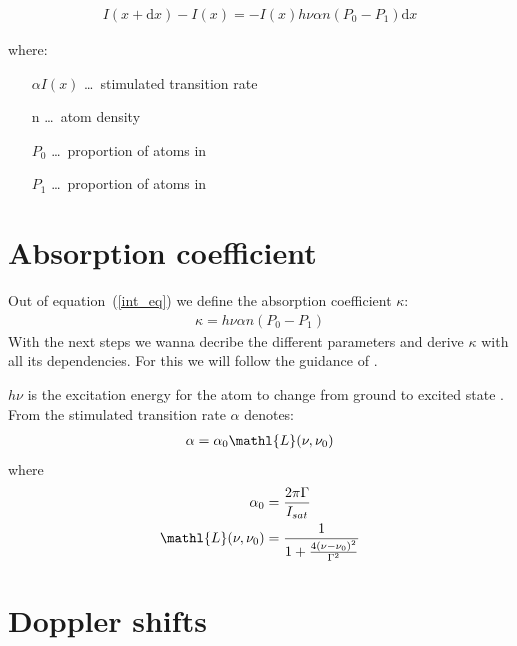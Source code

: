\begin{align}
    I(x+\mathrm{d}x)-I(x) = - I(x) h\nu \alpha n  (P_0-P_1) \mathrm{d}x \label{int_eq}
\end{align}

where:
\begin{itemize}
    \setlength{\itemsep}{0ex}
    \item[\(\alpha I(x)\)]\ldots~stimulated transition rate
    \item[n]\ldots~atom density
    \item[\(P_0\)]\ldots~proportion of atoms in 
    \item[\(P_1\)]\ldots~proportion of atoms in 
\end{itemize}
\pagebreak
\section{Absorption coefficient}  %
Out of equation~(\ref{int_eq}) we define the absorption coefficient \(\kappa \):
\begin{align}
    \kappa = h\nu \alpha n  (P_0-P_1) \label{kappa}
\end{align}
With the next steps we wanna decribe the different parameters and derive \(\kappa \) with all
its dependencies. For this we will follow the guidance of \citep{SAS}.
\bigskip

\(h\nu \) is the excitation energy for the atom to change from ground  to excited state . \\
From the stimulated transition rate \(\alpha \) denotes:
\begin{align}
    \alpha = \alpha_0 \mathl{L}(\nu,\nu_0)
\end{align}
where
\begin{align}
    \alpha_0 &= \frac{2\pi\Gamma}{I_{sat}} \\
    \mathl{L}(\nu,\nu_0) &= \frac{1}{ 1+\frac{ 4{(\nu-\nu_0)}^2 }{\Gamma^2} }
\end{align}


\pagebreak
\section{Doppler shifts}  %

